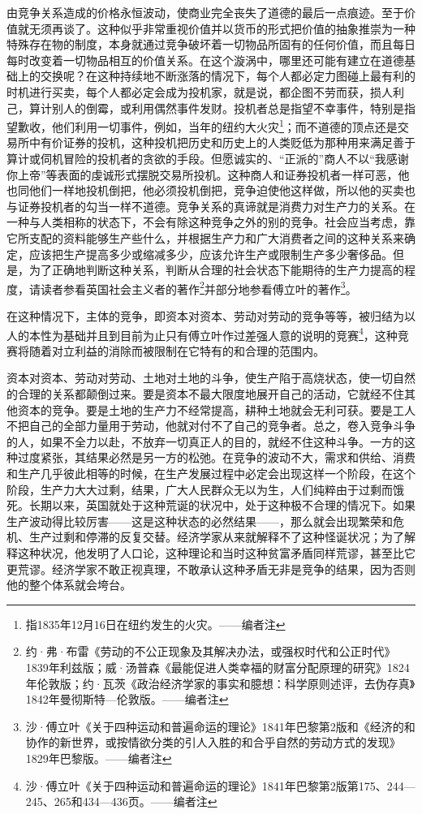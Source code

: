 \documentclass[a4paper,twoside,12pt,AutoFakeBold]{ctexart}
\begin{document}
由竞争关系造成的价格永恒波动，使商业完全丧失了道德的最后一点痕迹。至于价值就无须再谈了。这种似乎非常重视价值并以货币的形式把价值的抽象推崇为一种特殊存在物的制度，本身就通过竞争破坏着一切物品所固有的任何价值，而且每日每时改变着一切物品相互的价值关系。在这个漩涡中，哪里还可能有建立在道德基础上的交换呢？在这种持续地不断涨落的情况下，每个人都必定力图碰上最有利的时机进行买卖，每个人都必定会成为投机家，就是说，都企图不劳而获，损人利己，算计别人的倒霉，或利用偶然事件发财。投机者总是指望不幸事件，特别是指望歉收，他们利用一切事件，例如，当年的纽约大火灾\footnote{指1835年12月16日在纽约发生的火灾。——编者注 }；而不道德的顶点还是交易所中有价证券的投机，这种投机把历史和历史上的人类贬低为那种用来满足善于算计或伺机冒险的投机者的贪欲的手段。但愿诚实的、“正派的”商人不以“我感谢你上帝”等表面的虔诚形式摆脱交易所投机。这种商人和证券投机者一样可恶，他也同他们一样地投机倒把，他必须投机倒把，竞争迫使他这样做，所以他的买卖也与证券投机者的勾当一样不道德。竞争关系的真谛就是消费力对生产力的关系。在一种与人类相称的状态下，不会有除这种竞争之外的别的竞争。社会应当考虑，靠它所支配的资料能够生产些什么，并根据生产力和广大消费者之间的这种关系来确定，应该把生产提高多少或缩减多少，应该允许生产或限制生产多少奢侈品。但是，为了正确地判断这种关系，判断从合理的社会状态下能期待的生产力提高的程度，请读者参看英国社会主义者的著作\footnote{约·弗·布雷《劳动的不公正现象及其解决办法，或强权时代和公正时代》1839年利兹版；威·汤普森《最能促进人类幸福的财富分配原理的研究》1824年伦敦版；约·瓦茨《政治经济学家的事实和臆想：科学原则述评，去伪存真》1842年曼彻斯特—伦敦版。——编者注}并部分地参看傅立叶的著作\footnote{沙·傅立叶《关于四种运动和普遍命运的理论》1841年巴黎第2版和《经济的和协作的新世界，或按情欲分类的引人入胜的和合乎自然的劳动方式的发现》1829年巴黎版。——编者注}。

在这种情况下，主体的竞争，即资本对资本、劳动对劳动的竞争等等，被归结为以人的本性为基础并且到目前为止只有傅立叶作过差强人意的说明的竞赛\footnote{沙·傅立叶《关于四种运动和普遍命运的理论》1841年巴黎第2版第175、244—245、265和434—436页。——编者注}，这种竞赛将随着对立利益的消除而被限制在它特有的和合理的范围内。

资本对资本、劳动对劳动、土地对土地的斗争，使生产陷于高烧状态，使一切自然的合理的关系都颠倒过来。要是资本不最大限度地展开自己的活动，它就经不住其他资本的竞争。要是土地的生产力不经常提高，耕种土地就会无利可获。要是工人不把自己的全部力量用于劳动，他就对付不了自己的竞争者。总之，卷入竞争斗争的人，如果不全力以赴，不放弃一切真正人的目的，就经不住这种斗争。一方的这种过度紧张，其结果必然是另一方的松弛。在竞争的波动不大，需求和供给、消费和生产几乎彼此相等的时候，在生产发展过程中必定会出现这样一个阶段，在这个阶段，生产力大大过剩，结果，广大人民群众无以为生，人们纯粹由于过剩而饿死。长期以来，英国就处于这种荒诞的状况中，处于这种极不合理的情况下。如果生产波动得比较厉害——这是这种状态的必然结果——，那么就会出现繁荣和危机、生产过剩和停滞的反复交替。经济学家从来就解释不了这种怪诞状况；为了解释这种状况，他发明了人口论，这种理论和当时这种贫富矛盾同样荒谬，甚至比它更荒谬。经济学家不敢正视真理，不敢承认这种矛盾无非是竞争的结果，因为否则他的整个体系就会垮台。
\end{document}
